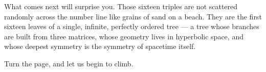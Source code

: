 What comes next will surprise you. Those sixteen triples are not scattered randomly across the number line like grains of sand on a beach. They are the first sixteen leaves of a single, infinite, perfectly ordered tree --- a tree whose branches are built from three matrices, whose geometry lives in hyperbolic space, and whose deepest symmetry is the symmetry of spacetime itself.

Turn the page, and let us begin to climb.

